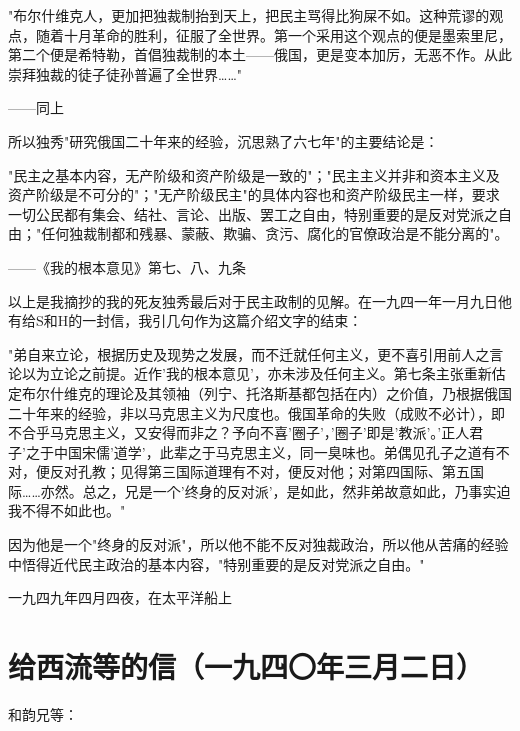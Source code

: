 \documentclass[
  openany,           %
  12pt,              %
  a4paper            %
]{ctexbook}
\newcommand{\fang}{\CJKfamily{fang}}
\newenvironment{quoteindent}
  {\list{}{\leftmargin=4em\rightmargin=0pt}\item\relax\fang\small}
  {\endlist}
\begin{document}
\begin{quoteindent}
"布尔什维克人，更加把独裁制抬到天上，把民主骂得比狗屎不如。这种荒谬的观点，随着十月革命的胜利，征服了全世界。第一个采用这个观点的便是墨索里尼，第二个便是希特勒，首倡独裁制的本土——俄国，更是变本加厉，无恶不作。从此崇拜独裁的徒子徒孙普遍了全世界……"
\end{quoteindent}

\hfill ——同上

所以独秀"研究俄国二十年来的经验，沉思熟了六七年"的主要结论是：

\begin{quoteindent}
"民主之基本内容，无产阶级和资产阶级是一致的"；"民主主义并非和资本主义及资产阶级是不可分的"；"无产阶级民主"的具体内容也和资产阶级民主一样，要求一切公民都有集会、结社、言论、出版、罢工之自由，特别重要的是反对党派之自由；"任何独裁制都和残暴、蒙蔽、欺骗、贪污、腐化的官僚政治是不能分离的"。
\end{quoteindent}

\hfill ——《我的根本意见》第七、八、九条

以上是我摘抄的我的死友独秀最后对于民主政制的见解。在一九四一年一月九日他有给S和H的一封信，我引几句作为这篇介绍文字的结束：

\begin{quoteindent}
"弟自来立论，根据历史及现势之发展，而不迁就任何主义，更不喜引用前人之言论以为立论之前提。近作'我的根本意见'，亦未涉及任何主义。第七条主张重新估定布尔什维克的理论及其领袖（列宁、托洛斯基都包括在内）之价值，乃根据俄国二十年来的经验，非以马克思主义为尺度也。俄国革命的失败（成败不必计），即不合乎马克思主义，又安得而非之？予向不喜'圈子'，'圈子'即是'教派'。'正人君子'之于中国宋儒'道学'，此辈之于马克思主义，同一臭味也。弟偶见孔子之道有不对，便反对孔教；见得第三国际道理有不对，便反对他；对第四国际、第五国际……亦然。总之，兄是一个'终身的反对派'，是如此，然非弟故意如此，乃事实迫我不得不如此也。"
\end{quoteindent}

因为他是一个"终身的反对派"，所以他不能不反对独裁政治，所以他从苦痛的经验中悟得近代民主政治的基本内容，"特别重要的是反对党派之自由。"

\hfill 一九四九年四月四夜，在太平洋船上

\chapter{给西流等的信（一九四〇年三月二日）}

\quad\quad 和韵兄等：
\end{document}
